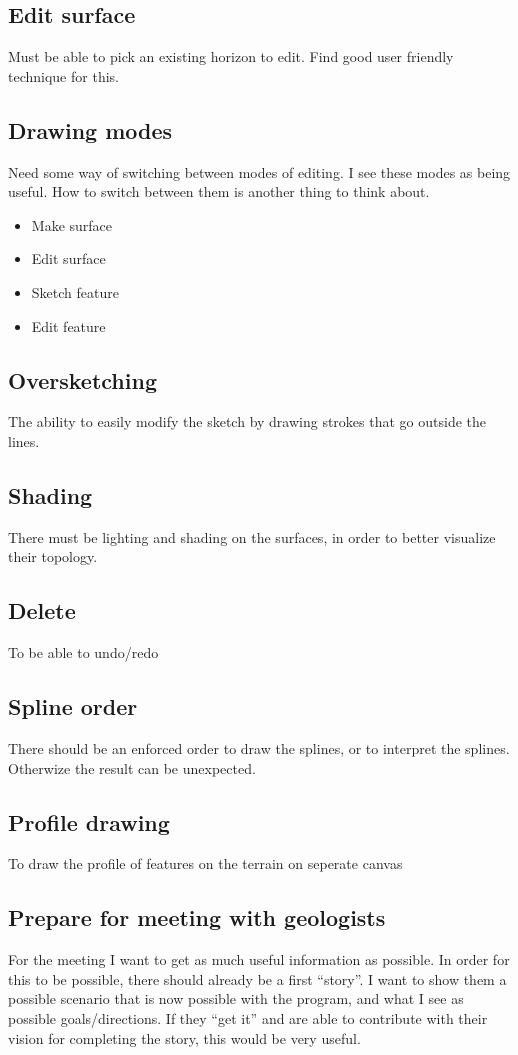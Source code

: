 \documentclass[a4paper,10pt]{article}
\begin{document}
\subsection*{Edit surface}
Must be able to pick an existing horizon to edit. Find good user friendly technique for this.
\subsection*{Drawing modes}
Need some way of switching between modes of editing. I see these modes as being useful. How to switch between them is another thing to think about.
\begin{itemize}
 \item Make surface
 \item Edit surface
 \item Sketch feature
 \item Edit feature
\end{itemize}
\subsection*{Oversketching}
The ability to easily modify the sketch by drawing strokes that go outside the lines. 
\subsection*{Shading}
There must be lighting and shading on the surfaces, in order to better visualize their topology.
\subsection*{Delete}
To be able to undo/redo
\subsection*{Spline order}
There should be an enforced order to draw the splines, or to interpret the splines. Otherwize the result can be unexpected.
\subsection*{Profile drawing}
To draw the profile of features on the terrain on seperate canvas
\subsection*{Prepare for meeting with geologists}
For the meeting I want to get as much useful information as possible. In order for this to be possible, there should already be a first ``story''. I want to show them a possible scenario that is now possible with the program, and what I see as possible goals/directions. If they ``get it'' and are able to contribute with their vision for completing the story, this would be very useful.
\end{document}
